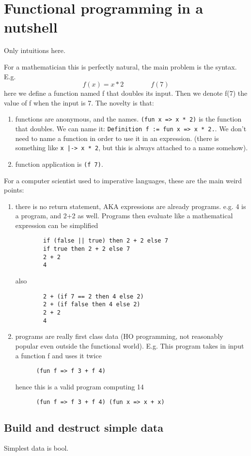 \section{Functional programming in a nutshell}
Only intuitions here.

For a mathematician this is perfectly natural, the main problem is the syntax.  E.g.
$$f(x) = x * 2\qquad\qquad f(7)$$
here we define a function named f that doubles its input.  Then we denote f(7) the value of f
when the input is 7. The novelty is that:
\begin{enumerate}
\item functions are anonymous, and the names. \verb+(fun x => x * 2)+ is the function that
	doubles.  We can name it: \verb+Definition f := fun x => x * 2.+.  We don't need to
	name a function in order to use it in an expression. (there is something like
	\verb+x |-> x * 2+, but this is always attached to a name somehow).
\item function application is \verb+(f 7)+.
\end{enumerate}

For a computer scientist used to imperative languages, these are the main weird points:
\begin{enumerate}
\item there is no return statement, AKA expressions are already programs.  e.g.
	4 is a program, and 2+2 as well.  Programs then evaluate like a mathematical expression
	can be simplified
\begin{verbatim}
        if (false || true) then 2 + 2 else 7
        if true then 2 + 2 else 7
        2 + 2
        4
\end{verbatim}
also
\begin{verbatim}
        2 + (if 7 == 2 then 4 else 2)
        2 + (if false then 4 else 2)
        2 + 2
        4
\end{verbatim}
\item programs are really first class data (HO programming, not reasonably popular even outside
	the functional world). E.g. 
    This program takes in input a function f and uses it twice
\begin{verbatim}
      (fun f => f 3 + f 4)
\end{verbatim}
hence this is a valid program computing 14
\begin{verbatim}
      (fun f => f 3 + f 4) (fun x => x + x)
\end{verbatim}
\end{enumerate}


\subsection{Build and destruct simple data}
Simplest data is bool.


